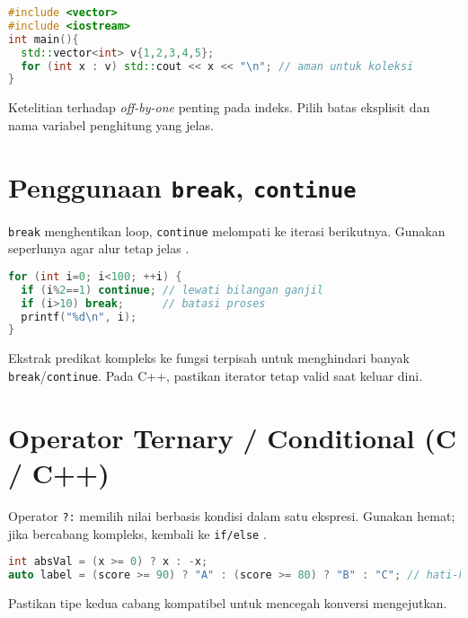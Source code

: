 \documentclass[../main.tex]{subfiles}
\begin{document}
\begin{lstlisting}[language=C++, caption={Range-based for (C++)}]
#include <vector>
#include <iostream>
int main(){
  std::vector<int> v{1,2,3,4,5};
  for (int x : v) std::cout << x << "\n"; // aman untuk koleksi
}
\end{lstlisting}

Ketelitian terhadap \emph{off-by-one} penting pada indeks. Pilih batas eksplisit dan nama variabel penghitung yang jelas.

\section{Penggunaan \texttt{break}, \texttt{continue}}
\texttt{break} menghentikan loop, \texttt{continue} melompati ke iterasi berikutnya. Gunakan seperlunya agar alur tetap jelas \parencite{gnu-c-manual,cpp-reference}.

\begin{lstlisting}[language=C, caption={break dan continue di C}]
for (int i=0; i<100; ++i) {
  if (i%2==1) continue; // lewati bilangan ganjil
  if (i>10) break;      // batasi proses
  printf("%d\n", i);
}
\end{lstlisting}

Ekstrak predikat kompleks ke fungsi terpisah untuk menghindari banyak \texttt{break}/\texttt{continue}. Pada C++, pastikan iterator tetap valid saat keluar dini.

\section{Operator Ternary / Conditional (C / C++)}
Operator \texttt{?:} memilih nilai berbasis kondisi dalam satu ekspresi. Gunakan hemat; jika bercabang kompleks, kembali ke \texttt{if/else} \parencite{cpp-reference}.

\begin{lstlisting}[language=C++]
int absVal = (x >= 0) ? x : -x;
auto label = (score >= 90) ? "A" : (score >= 80) ? "B" : "C"; // hati-hati keterbacaan
\end{lstlisting}

Pastikan tipe kedua cabang kompatibel untuk mencegah konversi mengejutkan.
\end{document}
